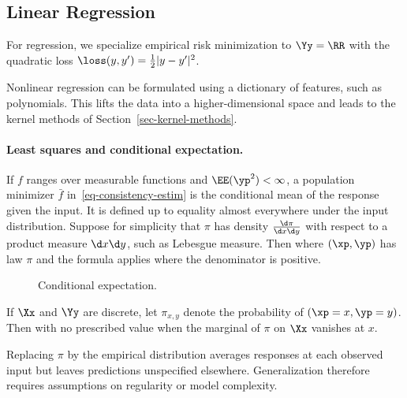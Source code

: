 \subsection{Linear Regression}
\label{sec-linear-models}

For regression, we specialize empirical risk minimization to $\Yy=\RR$ with the quadratic loss $\loss(y,y')=\frac{1}{2}|y-y'|^2$.

Nonlinear regression can be formulated using a dictionary of features, such as polynomials. This lifts the data into a higher-dimensional space and leads to the kernel methods of Section~\ref{sec-kernel-methods}.

\paragraph{Least squares and conditional expectation.}

If $f$ ranges over measurable functions and $\EE(\yp^2)<\infty$, a population minimizer $\bar f$ in~\eqref{eq-consistency-estim} is the conditional mean of the response given the input. It is defined up to equality almost everywhere under the input distribution.
%
Suppose for simplicity that $\pi$ has density $\frac{\d \pi}{\d x \d y}$ with respect to a product measure $\d x \d y$, such as Lebesgue measure. Then
where $(\xp,\yp)$ has law $\pi$ and the formula applies where the denominator is positive.


\begin{figure}[tbp]
\centering
{}
\caption{Conditional expectation.}
\label{fig-bound-regul}
\end{figure}

If $\Xx$ and $\Yy$ are discrete, let $\pi_{x,y}$ denote the probability of $(\xp=x,\yp=y)$. Then
with no prescribed value when the marginal of $\pi$ on $\Xx$ vanishes at $x$.

Replacing $\pi$ by the empirical distribution averages responses at each observed input but leaves predictions unspecified elsewhere. Generalization therefore requires assumptions on regularity or model complexity.


